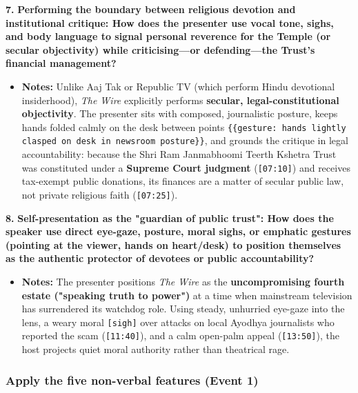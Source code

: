 \documentclass[10pt,a4paper]{article}
\begin{document}
\noindent\textbf{7.} \textbf{Performing the boundary between religious devotion and institutional critique: How does the presenter use vocal tone, sighs, and body language to signal personal reverence for the Temple (or secular objectivity) while criticising---or defending---the Trust's financial management?}\par\smallskip
\begin{itemize}
  \item \textbf{Notes:}
Unlike Aaj Tak or Republic TV (which perform Hindu devotional insiderhood), \textit{The Wire} explicitly performs \textbf{secular, legal-constitutional objectivity}. The presenter sits with composed, journalistic posture, keeps hands folded calmly on the desk between points \texttt{\{\{gesture: hands lightly clasped on desk in newsroom posture\}\}}, and grounds the critique in legal accountability: because the Shri Ram Janmabhoomi Teerth Kshetra Trust was constituted under a \textbf{Supreme Court judgment} (\texttt{[07:10]}) and receives tax-exempt public donations, its finances are a matter of secular public law, not private religious faith (\texttt{[07:25]}).\par\smallskip
\end{itemize}

\noindent\textbf{8.} \textbf{Self-presentation as the "guardian of public trust": How does the speaker use direct eye-gaze, posture, moral sighs, or emphatic gestures (pointing at the viewer, hands on heart/desk) to position themselves as the authentic protector of devotees or public accountability?}\par\smallskip
\begin{itemize}
  \item \textbf{Notes:}
The presenter positions \textit{The Wire} as the \textbf{uncompromising fourth estate ("speaking truth to power")} at a time when mainstream television has surrendered its watchdog role. Using steady, unhurried eye-gaze into the lens, a weary moral \texttt{[sigh]} over attacks on local Ayodhya journalists who reported the scam (\texttt{[11:40]}), and a calm open-palm appeal (\texttt{[13:50]}), the host projects quiet moral authority rather than theatrical rage.\par\smallskip
\end{itemize}

\subsubsection*{Apply the five non-verbal features (Event 1)}
\end{document}
